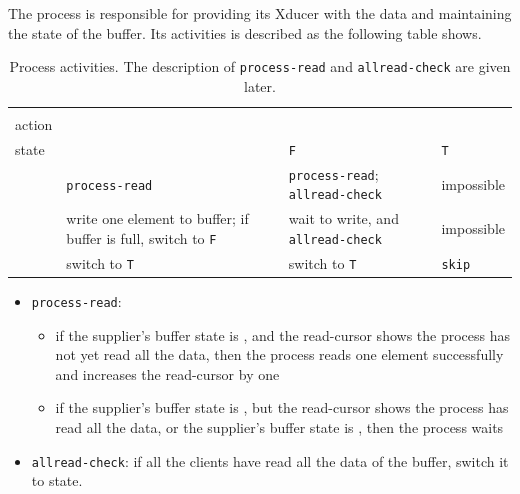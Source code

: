 The process is responsible for providing its Xducer with the data and maintaining the state of the buffer. 
Its activities is described as the following table shows.


 \begin{table}[H]\large
 	\renewcommand\arraystretch{1.5}
 	\centering
 	\begin{tabular}{|l|p{}|p{}|l|}  
 		\hline
 		 \diagbox{Xducer \\ action}{Buffer \\ state} & \filling & \draining \texttt{F} & \draining \texttt{T} \\ \hline
 		\pin  & \texttt{process-read}  & \texttt{process-read}; \texttt{allread-check}  & impossible \\
 		\hline
 		\pout &  write one element to buffer;
 		if buffer is full, switch to \draining \texttt{F}    &    wait to write, and \texttt{allread-check}   & impossible \\ 
 		\hline
 		\done &  switch to \draining \texttt{T}      & switch to \draining \texttt{T}   & \texttt{skip}  \\ 
 		\hline
 	\end{tabular}
 \caption{Process activities. The description of \texttt{process-read} and \texttt{allread-check} are given later.}
 \end{table}

\begin{itemize}
\item \texttt{process-read}:

\begin{itemize}
	\item if the supplier's buffer state is \draining, and the read-cursor shows the process has not yet read all the data, then the process reads one element successfully and increases the read-cursor by one
	\item if the supplier's buffer state is \draining, but the read-cursor shows the process has read all the data, or the supplier's buffer state is \filling, then the process waits 
\end{itemize}

\item \texttt{allread-check}: if all the clients have read all the data of the buffer, switch it to \filling state.
\end{itemize}


